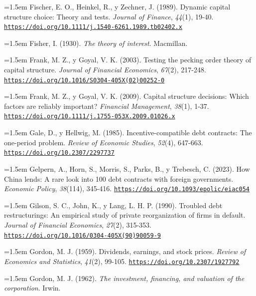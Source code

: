 \documentclass[10pt,a4paper]{article}
\begin{document}
\noindent\hangindent=1.5em Fischer, E. O., Heinkel, R., y Zechner, J. (1989). Dynamic capital structure choice: Theory and tests. \textit{Journal of Finance}, \textit{44}(1), 19-40. \href{https://doi.org/10.1111/j.1540-6261.1989.tb02402.x}{\nolinkurl{https://doi.org/10.1111/j.1540-6261.1989.tb02402.x}}

\noindent\hangindent=1.5em Fisher, I. (1930). \textit{The theory of interest}. Macmillan.

\noindent\hangindent=1.5em Frank, M. Z., y Goyal, V. K. (2003). Testing the pecking order theory of capital structure. \textit{Journal of Financial Economics}, \textit{67}(2), 217-248. \href{https://doi.org/10.1016/S0304-405X(02)00252-0}{\nolinkurl{https://doi.org/10.1016/S0304-405X(02)00252-0}}

\noindent\hangindent=1.5em Frank, M. Z., y Goyal, V. K. (2009). Capital structure decisions: Which factors are reliably important? \textit{Financial Management}, \textit{38}(1), 1-37. \href{https://doi.org/10.1111/j.1755-053X.2009.01026.x}{\nolinkurl{https://doi.org/10.1111/j.1755-053X.2009.01026.x}}

\noindent\hangindent=1.5em Gale, D., y Hellwig, M. (1985). Incentive-compatible debt contracts: The one-period problem. \textit{Review of Economic Studies}, \textit{52}(4), 647-663. \href{https://doi.org/10.2307/2297737}{\nolinkurl{https://doi.org/10.2307/2297737}}

\noindent\hangindent=1.5em Gelpern, A., Horn, S., Morris, S., Parks, B., y Trebesch, C. (2023). How China lends: A rare look into 100 debt contracts with foreign governments. \textit{Economic Policy}, \textit{38}(114), 345-416. \href{https://doi.org/10.1093/epolic/eiac054}{\nolinkurl{https://doi.org/10.1093/epolic/eiac054}}

\noindent\hangindent=1.5em Gilson, S. C., John, K., y Lang, L. H. P. (1990). Troubled debt restructurings: An empirical study of private reorganization of firms in default. \textit{Journal of Financial Economics}, \textit{27}(2), 315-353. \href{https://doi.org/10.1016/0304-405X(90)90059-9}{\nolinkurl{https://doi.org/10.1016/0304-405X(90)90059-9}}

\noindent\hangindent=1.5em Gordon, M. J. (1959). Dividends, earnings, and stock prices. \textit{Review of Economics and Statistics}, \textit{41}(2), 99-105. \href{https://doi.org/10.2307/1927792}{\nolinkurl{https://doi.org/10.2307/1927792}}

\noindent\hangindent=1.5em Gordon, M. J. (1962). \textit{The investment, financing, and valuation of the corporation}. Irwin.
\end{document}
